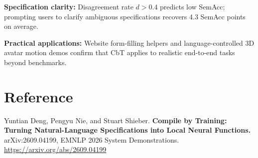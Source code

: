 \documentclass[10pt,twocolumn]{article}
\begin{document}
\textbf{Specification clarity:} Disagreement rate $d > 0.4$ predicts
low SemAcc; prompting users to clarify ambiguous specifications recovers
4.3 SemAcc points on average.

\textbf{Practical applications:} Website form-filling helpers and
language-controlled 3D avatar motion demos confirm that CbT applies
to realistic end-to-end tasks beyond benchmarks.

\section*{Reference}

Yuntian Deng, Pengyu Nie, and Stuart Shieber.
\textbf{Compile by Training: Turning Natural-Language Specifications
into Local Neural Functions.}
arXiv:2609.04199, EMNLP 2026 System Demonstrations.
\url{https://arxiv.org/abs/2609.04199}
\end{document}
